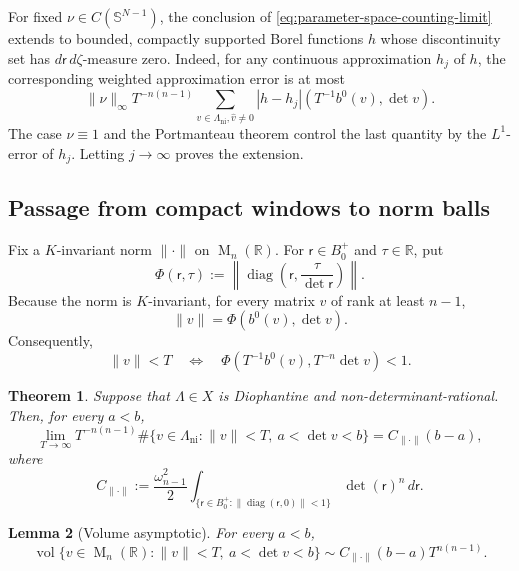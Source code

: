 \documentclass[reqno,11pt]{amsart}
\numberwithin{equation}{section}
\newtheorem{theorem}{Theorem}[section]
\newtheorem{lemma}[theorem]{Lemma}
\theoremstyle{definition}
\theoremstyle{remark}
\newcommand{\op}{\operatorname}
\newcommand{\R}{\mathbb R}
\newcommand{\M}{\op{M}}
\renewcommand{\r}{\mathsf r}
\begin{document}
For fixed $\nu\in C(\mathbb S^{N-1})$, the conclusion of
\eqref{eq:parameter-space-counting-limit} extends to bounded, compactly
supported Borel functions $h$ whose discontinuity set has
$d\mathsf r\,d\zeta$-measure zero. Indeed, for any continuous
approximation $h_j$ of $h$, the corresponding weighted approximation
error is at most
$$
\|\nu\|_\infty T^{-n(n-1)}
\sum_{{v\in\Lambda_{\operatorname{ni}}, \widehat v\ne0}}
|h-h_j|(T^{-1}b^0(v),\det v).
$$
The case $\nu\equiv1$ and the Portmanteau theorem control the last
quantity by the $L^1$-error of $h_j$. Letting $j\to\infty$ proves the
extension.

\subsection{Passage from compact windows to norm balls}
Fix a $K$-invariant norm $\|\cdot\|$ on $\M_n(\R)$.  For
$\r\in B_0^+$ and $\tau\in\R$, put
\begin{equation}
\Phi(\r,\tau)
:=
\left\|
\operatorname{diag}\left(\r,\frac{\tau}{\det \r}\right)
\right\|.
\end{equation}
Because the norm is $K$-invariant, for every matrix $v$ of rank at
least $n-1$,
\begin{equation}\label{eq:K-inv-reduction}
\|v\|=\Phi(b^0(v),\det v).
\end{equation}
Consequently,
\begin{equation}\label{eq:scaled-K-inv-reduction}
\|v\|<T
\quad\Longleftrightarrow\quad
\Phi(T^{-1}b^0(v),T^{-n}\det v)<1.
\end{equation}

\begin{theorem}
\label{thm:13.11-corrected}
Suppose that $\Lambda\in X$ is Diophantine and
non-determinant-rational. Then, for every $a<b$,
\begin{equation}\label{eq:norm-ball-counting}
\lim_{T\to\infty}T^{-n(n-1)}
\#\{v\in\Lambda_{\operatorname{ni}}:
\|v\|<T,\ a<\det v<b\}
=
C_{\|\cdot\|}(b-a),
\end{equation}
where
\begin{equation}\label{mconstant}
C_{\|\cdot\|}
:=
\frac{\omega_{n-1}^2}{2}
\int_{\{\mathsf r\in B_0^+:
\|\operatorname{diag}(\mathsf r,0)\|<1\}}
\det(\mathsf r)^n\,d\mathsf r.
\end{equation}
\end{theorem}

\begin{lemma}[Volume asymptotic]
\label{lem:volume-main-term}
For every $a<b$,
\begin{equation}\label{eq:volume-main-term}
\operatorname{vol}
\{v\in\M_n(\mathbb R):
\|v\|<T,\ a<\det v<b\}
\sim
C_{\|\cdot\|}(b-a)T^{n(n-1)}.
\end{equation}
\end{lemma}
\end{document}
